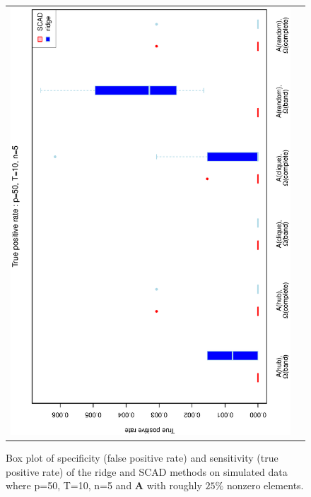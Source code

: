 \begin{figure}[h!]
\begin{tabular}{cc}
\includegraphics[scale=0.45,angle=270]{ROCtpr50T10N5_25.eps}
\end{tabular}
\caption{Box plot of specificity (false positive rate) and sensitivity (true positive rate) of the ridge and SCAD  methods on simulated data where p=50, T=10,  n=5 and $\mathbf{A}$ with roughly $25\%$ nonzero elements.}
\label{figSM:RocP50T10N5_25}
\end{figure}
\clearpage


